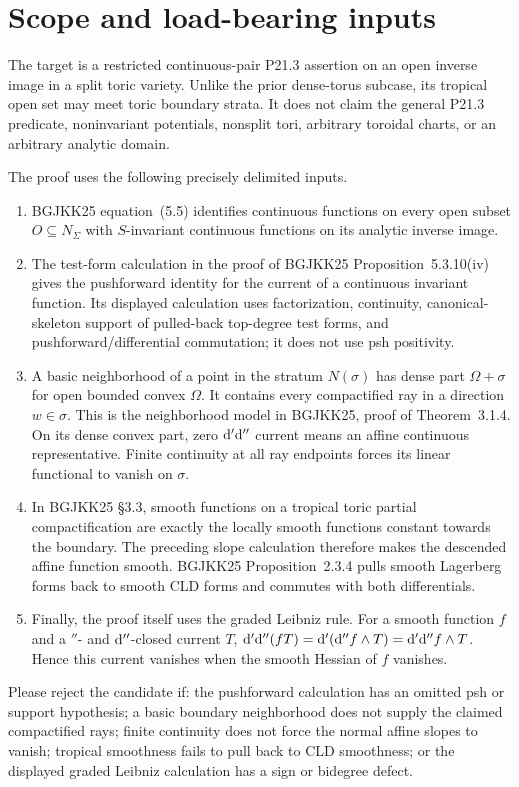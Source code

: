 \section*{Scope and load-bearing inputs}

The target is a restricted continuous-pair P21.3 assertion on an open inverse
image in a split toric variety.  Unlike the prior dense-torus subcase, its
tropical open set may meet toric boundary strata.  It does not claim the
general P21.3 predicate, noninvariant potentials, nonsplit tori, arbitrary
toroidal charts, or an arbitrary analytic domain.

The proof uses the following precisely delimited inputs.
\begin{enumerate}
\item BGJKK25 equation~(5.5) identifies continuous functions on every open
subset $O\subseteq N_\Sigma$ with $S$-invariant continuous functions on its
analytic inverse image.
\item The test-form calculation in the proof of BGJKK25
Proposition~5.3.10(iv) gives the pushforward identity for the current of a
continuous invariant function.  Its displayed calculation uses factorization,
continuity, canonical-skeleton support of pulled-back top-degree test forms,
and pushforward/differential commutation; it does not use psh positivity.
\item A basic neighborhood of a point in the stratum $N(\sigma)$ has dense
part $\Omega+\sigma$ for open bounded convex $\Omega$.  It contains every
compactified ray in a direction $w\in\sigma$.  This is the neighborhood model
in BGJKK25, proof of Theorem~3.1.4.  On its dense convex part, zero
$\mathrm d'\mathrm d''$ current means an affine continuous representative.  Finite
continuity at all ray endpoints forces its linear functional to vanish on
$\sigma$.
\item In BGJKK25 \S3.3, smooth functions on a tropical toric partial
compactification are exactly the locally smooth functions constant towards
the boundary.  The preceding slope calculation therefore makes the descended
affine function smooth.  BGJKK25 Proposition~2.3.4 pulls smooth Lagerberg
forms back to smooth CLD forms and commutes with both differentials.
\item Finally, the proof itself uses the graded Leibniz rule.  For a smooth
function $f$ and a $\dprime$- and $\mathrm d''$-closed current $T$,
$\mathrm d'\mathrm d''(fT)=\mathrm d'(\mathrm d'' f\wedge T)
=\mathrm d'\mathrm d'' f\wedge T$.  Hence this current vanishes when the smooth
Hessian of $f$ vanishes.
\end{enumerate}

Please reject the candidate if: the pushforward calculation has an omitted
psh or support hypothesis; a basic boundary neighborhood does not supply the
claimed compactified rays; finite continuity does not force the normal affine
slopes to vanish; tropical smoothness fails to pull back to CLD smoothness;
or the displayed graded Leibniz calculation has a sign or bidegree defect.
